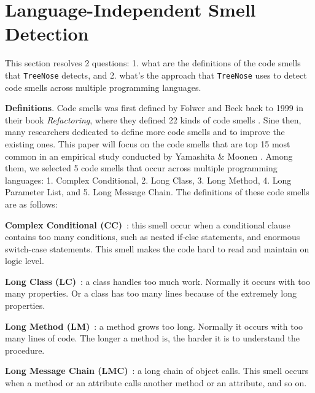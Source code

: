 


\vspace*{-0.5em}

\section{Language-Independent Smell Detection}

\vspace*{-0.1em}

This section resolves 2 questions: 1. what are the definitions of the code
smells that \texttt{TreeNose} detects, and 2. what's the approach that
\texttt{TreeNose} uses to detect code smells across multiple programming
languages.


{\bf Definitions}. Code smells was first defined by Folwer and Beck back to 1999
in their book \textit{Refactoring}, where they defined 22 kinds of code smells
\cite{Fowler_Beck}. Sine then, many researchers dedicated to define more code
smells and to improve the existing ones. This paper will focus on the code
smells that are top 15 most common in an empirical study conducted by Yamashita
\& Moonen \cite{developersCare}. Among them, we selected 5 code smells that
occur across multiple programming languages: 1. Complex Conditional, 2. Long
Class, 3. Long Method, 4. Long Parameter List, and 5. Long Message Chain. The
definitions of these code smells are as follows:

\textbf{Complex Conditional (CC)}~\cite{Fowler_Beck}: this smell occur when a
conditional clause contains too many conditions, such as nested if-else
statements, and enormous switch-case statements. This smell makes the code hard
to read and maintain on logic level.

\textbf{Long Class (LC)}~\cite{Fowler_Beck}: a class handles too much work.
Normally it occurs with too many properties. Or a class has too many lines
because of the extremely long properties.

\textbf{Long Method (LM)}~\cite{Fowler_Beck}: a method grows too long. Normally
it occurs with too many lines of code. The longer a method is, the harder it is
to understand the procedure.

\textbf{Long Message Chain (LMC)}~\cite{Fowler_Beck}: a long chain of object
calls. This smell occurs when a method or an attribute calls another method or
an attribute, and so on.


